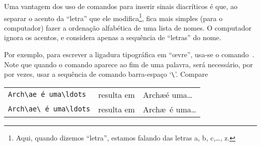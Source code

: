 \documentclass[article,openany]{memoir}
\newcommand*{\as}[1]{%
  `\thinspace\texttt{#1}\thinspace'}
\newenvironment{exemplo}{\begin{center}}{\end{center}}
\begin{document}
Uma vantagem dos uso de comandos para inserir sinais diacríticos é
que, ao separar o acento da ``letra'' que ele modifica\footnote{Aqui,
  quando dizemos ``letra'', estamos falando das letras a, b, c,\ldots,
  z.}, fica mais simples (para o computador) fazer a ordenação
alfabética de uma lista de nomes. O computador ignora os acentos, e
considera apenas a sequência de ``letras'' do nome.

Por exemplo, para escrever a ligadura tipográfica em ``\oe vre'',
usa-se o comando~. Note que quando o comando aparece ao fim de
uma palavra, será necessário, por por vezes, usar a sequência de
comando barra-espaço \as{\textbackslash\textvisiblespace}. Compare
\begin{exemplo}
\begin{tabular}{lll}
\verb/Arch\ae é uma\ldots/ & resulta em & Arch\ae é uma\ldots \\
\verb/Arch\ae\ é uma\ldots/ & resulta em & Arch\ae\ é uma\ldots
\end{tabular}
\end{exemplo}
\end{document}
